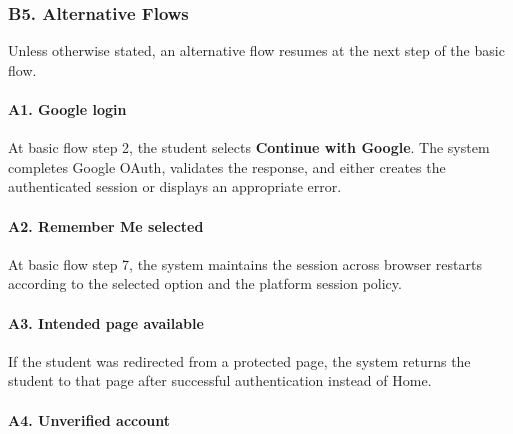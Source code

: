 \documentclass[12pt]{article}
\begin{document}
\hypertarget{sec:b5-alternative-flows}{}
\subsubsection*{B5. Alternative Flows}
\par\medskip

Unless otherwise stated, an alternative flow resumes at the next step of the basic flow.
\par\medskip

\hypertarget{sec:a1-google-login}{}
\paragraph*{A1. Google login}
\par\medskip

At basic flow step 2, the student selects \textbf{Continue with Google}. The system completes Google OAuth, validates the response, and either creates the authenticated session or displays an appropriate error.
\par\medskip

\hypertarget{sec:a2-remember-me-selected}{}
\paragraph*{A2. Remember Me selected}
\par\medskip

At basic flow step 7, the system maintains the session across browser restarts according to the selected option and the platform session policy.
\par\medskip

\hypertarget{sec:a3-intended-page-available}{}
\paragraph*{A3. Intended page available}
\par\medskip

If the student was redirected from a protected page, the system returns the student to that page after successful authentication instead of Home.
\par\medskip

\hypertarget{sec:a4-unverified-account}{}
\paragraph*{A4. Unverified account}
\par\medskip
\end{document}
